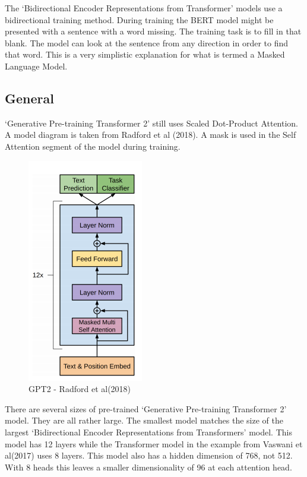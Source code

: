 The `Bidirectional Encoder Representations from Transformer' models use a bidirectional training method. During training the BERT model might be presented with a sentence with a word missing. The training task is to fill in that blank. The model can look at the sentence from any direction in order to find that word. This is a very simplistic explanation for what is termed a Masked Language Model.

\subsection*{General}
`Generative Pre-training Transformer 2' still uses Scaled Dot-Product Attention. A model diagram is taken from Radford et al (2018)\cite{radford2018improving}. A mask is used in the Self Attention segment of the model during training.

\begin{figure}[H]
	\begin{center}
		
		
		\includegraphics[scale=4.0]{diagram-mat05}
	\end{center}
	\caption[Generative Pre-training Transformer 2 ]{GPT2 - Radford et al(2018)\cite{radford2018improving}}
	

\end{figure}

There are several sizes of pre-trained `Generative Pre-training Transformer 2' model. They are all rather large. The smallest model matches the size of the largest `Bidirectional Encoder Representations from Transformers' model. This model has 12 layers while the Transformer model in the example from Vaswani et al(2017)\cite{Vaswani2017AttentionIA} uses 8 layers. This model also has a hidden dimension of 768, not 512. With 8 heads this leaves a smaller dimensionality of 96 at each attention head. 

